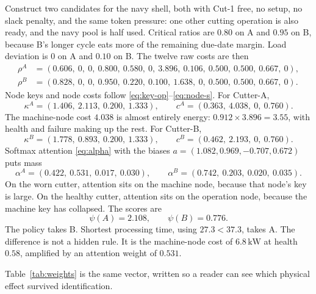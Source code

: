 Construct two candidates for the navy shell, both with Cut-1 free, no setup, no slack penalty, and the same token pressure: one other cutting operation is also ready, and the navy pool is half used. Critical ratios are \(0.80\) on A and \(0.95\) on B, because B's longer cycle eats more of the remaining due-date margin. Load deviation is \(0\) on A and \(0.10\) on B. The twelve raw costs are then
\begin{align}
\rho^{A} &= (0.606,\ 0,\ 0,\ 0.800,\ 0.580,\ 0,\ 3.896,\ 0.106,\ 0.500,\ 0.500,\ 0.667,\ 0), \\
\rho^{B} &= (0.828,\ 0,\ 0,\ 0.950,\ 0.220,\ 0.100,\ 1.638,\ 0,\ 0.500,\ 0.500,\ 0.667,\ 0).
\end{align}
Node keys and node costs follow \eqref{eq:key-op}--\eqref{eq:node-s}. For Cutter-A,
\begin{equation}
\kappa^{A} = (1.406,\ 2.113,\ 0.200,\ 1.333), \qquad
c^{A} = (0.363,\ 4.038,\ 0,\ 0.760).
\end{equation}
The machine-node cost \(4.038\) is almost entirely energy: \(0.912 \times 3.896 = 3.55\), with health and failure making up the rest. For Cutter-B,
\begin{equation}
\kappa^{B} = (1.778,\ 0.893,\ 0.200,\ 1.333), \qquad
c^{B} = (0.462,\ 2.193,\ 0,\ 0.760).
\end{equation}
Softmax attention \eqref{eq:alpha} with the biases \(a = (1.082, 0.969, -0.707, 0.672)\) puts mass
\begin{equation}
\alpha^{A} = (0.422,\ 0.531,\ 0.017,\ 0.030), \qquad
\alpha^{B} = (0.742,\ 0.203,\ 0.020,\ 0.035).
\end{equation}
On the worn cutter, attention sits on the machine node, because that node's key is large. On the healthy cutter, attention sits on the operation node, because the machine key has collapsed. The scores are
\begin{equation}
\psi(A) = 2.108, \qquad \psi(B) = 0.776.
\end{equation}
The policy takes B. Shortest processing time, using \(27.3 < 37.3\), takes A. The difference is not a hidden rule. It is the machine-node cost of \(6.8\,\mathrm{kW}\) at health \(0.58\), amplified by an attention weight of \(0.531\).

Table~\ref{tab:weights} is the same vector, written so a reader can see which physical effect survived identification.

